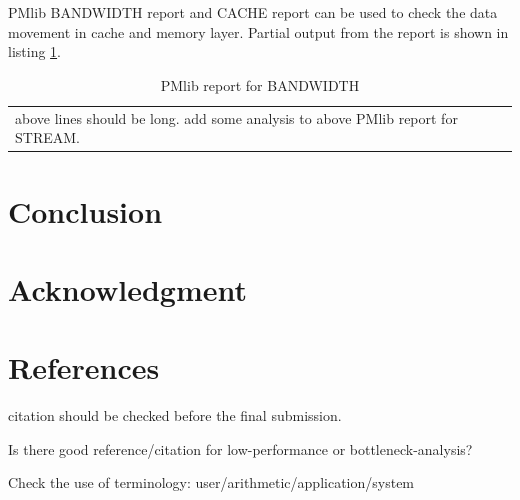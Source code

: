 \documentclass[conference]{IEEEtran}
\begin{document}
PMlib BANDWIDTH report and CACHE report can be used
to check the data movement in cache and memory layer.
Partial output from the report is shown in listing \ref{tab:report-BANDWIDTH}.

\begin{table}[tb]
\scriptsize
\caption{PMlib report for BANDWIDTH}
\label{tab:report-BANDWIDTH}
\footnotesize
\begin{tabular}{l} \hline
\scriptsize


above lines should be long.
add some analysis to above PMlib report for STREAM.
\end{tabular}
\end{table}


\section{Conclusion}

\section*{Acknowledgment}

\section*{References}

{\color{blue}
citation should be checked before the final submission.\par
Is there good reference/citation for low-performance  or bottleneck-analysis?
}

{\color{blue} Check the use of terminology: user/arithmetic/application/system}




\end{document}
